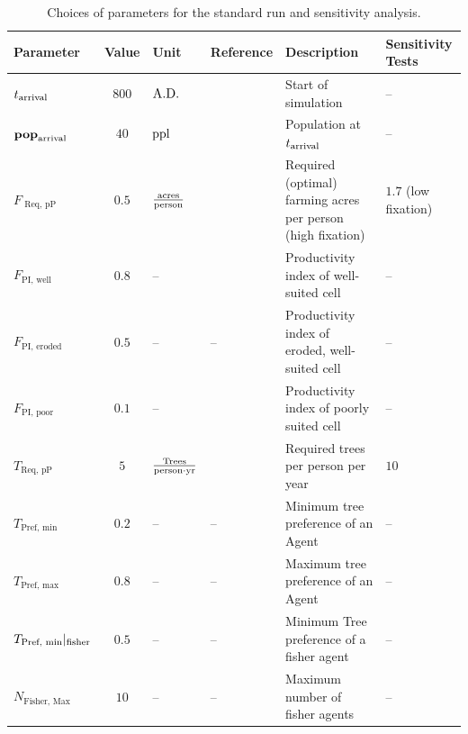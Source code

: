 \begin{table}
	  	  	\caption{Choices of parameters for the standard run and sensitivity analysis. %
	}
	\begin{tabular}{P|S|H|Q|M|P}
		Parameter & Value & Unit & Reference & Description & Sensitivity Tests \\ \hline
		$t_{\rm arrival}$ & $800$ &${\rm A.D.}$& \citet{Bahn2017} & Start of simulation & --\\
		$\mathbf{pop}_{\rm arrival}$ & $40$ & ${\rm ppl}$ & \citet{Brander1998} & Population at $t_{\rm arrival}$ & --\\ \hline
		 $F_\text{ Req, pP}$ & $0.5$ & ${\rm \frac{acres}{person}}$ & \citet{Puleston2017} & Required (optimal) farming acres per person (high fixation) & $1.7$ (low fixation) \\
		 $F_\text{PI, well}$ & $0.8$ & -- & \citet{Louwagie2006} & Productivity index of well-suited cell & -- \\
		 $F_\text{PI, eroded}$ & $0.5$ & -- & -- & Productivity index of eroded, well-suited cell & --\\
		 $F_\text{PI, poor}$ & $0.1$ & -- & \citet{Louwagie2006} & Productivity index of poorly suited cell & -- \\ 
		 $T_\text{Req, pP}$ & $5$ & $ {\rm \frac{Trees}{person \cdot yr}}$ & \citet{Brandt2015} & Required trees per person per year & $10$  \\
		  $T_\text{Pref, min}$ & $0.2$ & --&-- & Minimum tree preference of an Agent&  -- \\ 
		  $T_\text{Pref, max}$ & $0.8$ & --&-- & Maximum tree preference of an Agent&  -- \\
		  $T_\text{Pref, min}|_{\rm fisher}$ & $0.5$ & --&-- & Minimum Tree preference of a fisher agent&  -- \\
		  $N_\text{Fisher, Max}$ & $10$ & --&-- & Maximum number of fisher agents &  -- \\ \hline
		  

\end{tabular}
\end{table}
